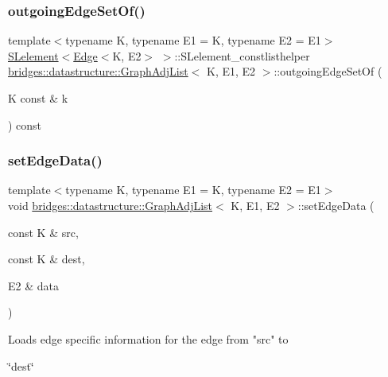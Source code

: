 \subsubsection{\texorpdfstring{outgoingEdgeSetOf()}{outgoingEdgeSetOf()}\hspace{0.1cm}{\footnotesize\ttfamily [2/2]}}
{\footnotesize\ttfamily template$<$typename K, typename E1 = K, typename E2 = E1$>$ \\
\mbox{\hyperlink{classbridges_1_1datastructure_1_1_s_lelement}{S\+Lelement}}$<$\mbox{\hyperlink{classbridges_1_1datastructure_1_1_edge}{Edge}}$<$K, E2$>$ $>$\+::S\+Lelement\+\_\+constlisthelper \mbox{\hyperlink{classbridges_1_1datastructure_1_1_graph_adj_list}{bridges\+::datastructure\+::\+Graph\+Adj\+List}}$<$ K, E1, E2 $>$\+::outgoing\+Edge\+Set\+Of (\begin{DoxyParamCaption}\item[{K const \&}]{k }\end{DoxyParamCaption}) const\hspace{0.3cm}{\ttfamily [inline]}}

\mbox{\label{classbridges_1_1datastructure_1_1_graph_adj_list_a21a7e957d60e18b540dc778b1d569372}} 
\subsubsection{\texorpdfstring{setEdgeData()}{setEdgeData()}}
{\footnotesize\ttfamily template$<$typename K, typename E1 = K, typename E2 = E1$>$ \\
void \mbox{\hyperlink{classbridges_1_1datastructure_1_1_graph_adj_list}{bridges\+::datastructure\+::\+Graph\+Adj\+List}}$<$ K, E1, E2 $>$\+::set\+Edge\+Data (\begin{DoxyParamCaption}\item[{const K \&}]{src,  }\item[{const K \&}]{dest,  }\item[{E2 \&}]{data }\end{DoxyParamCaption})\hspace{0.3cm}{\ttfamily [inline]}}

\begin{DoxyVerb}Loads edge specific information for the edge from "src" to
\end{DoxyVerb}
 \char`\"{}dest\char`\"{}


